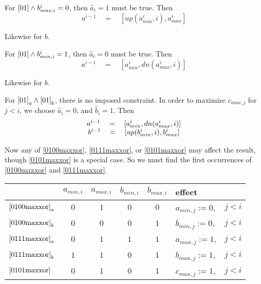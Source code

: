 \documentclass{article}
\begin{document}
For $\eqref{01} \wedge b^i_{max,i} = 0$, 
then $ \hat a_i = 1$ must be true.
Then
\begin{equation}\label{0100maxxor} 
a^{i-1} \quad = \quad [up(a^i_{min}, i), a^i_{max}]
\end{equation}

Likewise for $b$.
\vspace{10pt}

For $\eqref{01}  \wedge  b^i_{min,i} = 1$, 
then $\hat a_i = 0$ must be true.
Then
\begin{equation}\label{0111maxxor} 
a^{i-1} \quad = \quad [a^i_{min}, dn(a^i_{max},i)]
\end{equation}

Likewise for $b$.
\vspace{10pt}

For $\eqref{01}_a  \wedge  \eqref{01}_b$, there is no imposed constraint.
In order to maximize $c_{max,j}$ for $j<i$, 
we choose $\hat a_i = 0$, and $\hat b_i = 1$.
Then
\begin{equation}\label{0101maxxor}
\begin{tabular}{c}
$a^{i-1} \quad = \quad [a^i_{min}, dn(a^i_{max},i)]$\\
$b^{i-1} \quad = \quad [up(b^i_{min},i), b^i_{max}]$
\end{tabular}
\end{equation}

Now any of \eqref{0100maxxor}, \eqref{0111maxxor}, or \eqref{0101maxxor} 
may affect the result, though \eqref{0101maxxor}
is a special case.
So we must find the first occurrences of 
\eqref{0100maxxor} and \eqref{0111maxxor}.

\begin{tabular}{l|c|c|c|c|l r}
& $a_{min,i}$ & $a_{max,i}$ & $b_{min,i}$ & $b_{max,i}$ & effect &\\
\hline
$\eqref{0100maxxor}_a$ & $0$ & $1$ & $0$ & $0$ & 
$a_{min,j} := 0$, \;& $j < i$ \\
\hline
$\eqref{0100maxxor}_b$ & $0$ & $0$ & $0$ & $1$ & 
$b_{min,j} := 0$, \;& $j < i$ \\
\hline
$\eqref{0111maxxor}_a$ & $0$ & $1$ & $1$ & $1$ & 
$a_{max,j} := 1$, \;& $j < i$ \\
\hline
$\eqref{0111maxxor}_b$ & $1$ & $1$ & $0$ & $1$ & 
$b_{max,j} := 1$, \;& $j < i$ \\
\hline
$\eqref{0101maxxor}$ & $0$ & $1$ & $0$ & $1$ & 
$c_{max,j} := 1$, \;& $j < i$ \\
\end{tabular}
\vspace{10pt}
\end{document}

